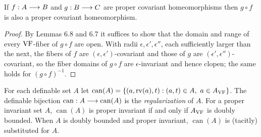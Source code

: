 \setcounter{theorem}{8}
\begin{lemma}
\label{pr-co-home-com}
\leanok
{}
If $f:A\longrightarrow B$ and $g:B\longrightarrow C$ are proper covariant homeomorphisms then $g\circ f$ is also a proper covariant homeomorphism.
\end{lemma}

\begin{proof}
\leanok
By Lemmas 6.8 and 6.7 it suffices to show that the domain and range of every $\mathrm{VF}$-fiber of $g\circ f$ are open. With radii $\epsilon,\epsilon',\epsilon''$, each sufficiently larger than the next, the fibers of $f$ are $(\epsilon,\epsilon')$-covariant and those of $g$ are $(\epsilon',\epsilon'')$-covariant, so the fiber domains of $g\circ f$ are $\epsilon$-invariant and hence clopen; the same holds for $(g\circ f)^{-1}$.
\end{proof}

\setcounter{theorem}{9}
\begin{definition}[Regularization]
\label{conv-can}
\leanok
{}
For each definable set $A$ let $\operatorname{can}(A)=\{(a,\rv(a),t):(a,t)\in A,\ a\in A_{\VF}\}$. The definable bijection $\operatorname{can}:A\longrightarrow\operatorname{can}(A)$ is the \emph{regularization} of $A$. For a proper invariant set $A$, $\operatorname{can}(A)$ is proper invariant if and only if $A_{\mathrm{VF}}$ is doubly bounded. When $A$ is doubly bounded and proper invariant, $\operatorname{can}(A)$ is (tacitly) substituted for $A$.
\end{definition}

